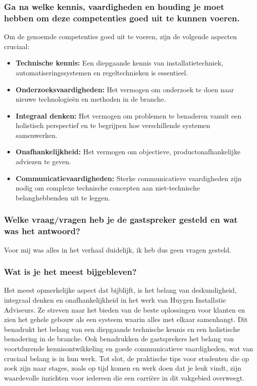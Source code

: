 \subsubsection{Ga na welke kennis, vaardigheden en houding je moet hebben om deze competenties goed uit te kunnen voeren.}
Om de genoemde competenties goed uit te voeren, zijn de volgende aspecten cruciaal:
\begin{itemize}
    \item \textbf{Technische kennis:} Een diepgaande kennis van installatietechniek, automatiseringssystemen en regeltechnieken is essentieel.
    \item \textbf{Onderzoeksvaardigheden:} Het vermogen om onderzoek te doen naar nieuwe technologieën en methoden in de branche.
    \item \textbf{Integraal denken:} Het vermogen om problemen te benaderen vanuit een holistisch perspectief en te begrijpen hoe verschillende systemen samenwerken.
    \item \textbf{Onafhankelijkheid:} Het vermogen om objectieve, productonafhankelijke adviezen te geven.
    \item \textbf{Communicatievaardigheden:} Sterke communicatieve vaardigheden zijn nodig om complexe technische concepten aan niet-technische belanghebbenden uit te leggen.
\end{itemize}
\subsubsection{Welke vraag/vragen heb je de gastspreker gesteld en wat was het antwoord?}
Voor mij was alles in het verhaal duidelijk, ik heb dus geen vragen gesteld.
\subsubsection{Wat is je het meest bijgebleven?}
Het meest opmerkelijke aspect dat bijblijft, is het belang van deskundigheid, integraal denken en onafhankelijkheid in het werk van Huygen Installatie Adviseurs. Ze streven naar het bieden van de beste oplossingen voor klanten en zien het gehele gebouw als een systeem waarin alles met elkaar samenhangt. Dit benadrukt het belang van een diepgaande technische kennis en een holistische benadering in de branche. Ook benadrukken de gastsprekers het belang van voortdurende kennisontwikkeling en goede communicatieve vaardigheden, wat van cruciaal belang is in hun werk. Tot slot, de praktische tips voor studenten die op zoek zijn naar stages, zoals op tijd komen en werk doen dat je leuk vindt, zijn waardevolle inzichten voor iedereen die een carrière in dit vakgebied overweegt.